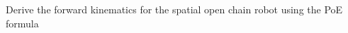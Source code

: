 \documentclass[preview]{standalone}
\begin{document}
\begin{center}
Derive the forward kinematics for the spatial open chain robot using the PoE formula
\end{center}
\end{document}
